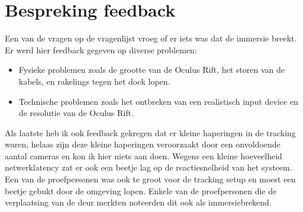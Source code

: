 \section{Bespreking feedback}
Een van de vragen op de vragenlijst vroeg of er iets was dat de immersie breekt.
Er werd hier feedback gegeven op diverse problemen:

\begin{itemize}
  \item Fysieke problemen zoals de grootte van de Oculus Rift, het storen van de
        kabels, en rakelings tegen het doek lopen.
  \item Technische problemen zoals het ontbreken van een realistisch input device
        en de resolutie van de Oculus Rift.
\end{itemize}

Als laatste heb ik ook feedback gekregen dat er kleine haperingen in de tracking
waren, helaas zijn deze kleine haperingen veroorzaakt door een onvoldoende aantal
cameras en kon ik hier niets aan doen. Wegens een kleine hoeveelheid 
netwerklatency zat er ook een beetje lag op de reactiesnelheid van het systeem. 
Een van de proefpersonen was ook te groot voor de tracking setup en moest een
beetje gebukt door de omgeving lopen. Enkele van de proefpersonen die de 
verplaatsing van de deur merkten noteerden dit ook als immersiebrekend.